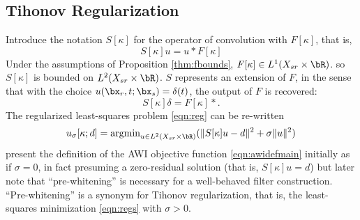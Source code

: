 

\subsection{Tihonov Regularization}
Introduce the notation $S[\kappa]$ for the operator of convolution
with $F[\kappa]$, that is,
\begin{equation}
  \label{eqn:sdef}
  S[\kappa]u = u*F[\kappa]
\end{equation}
Under the assumptions of Proposition \ref{thm:fbounds}, $F[\kappa] \in
L^1(X_{sr} \times \bR)$. so $S[\kappa]$ is bounded on $L^2(X_{sr} \times \bR)$.
$S$ represents an
extension of $F$, in the sense that with the choice
$u(\bx_r,t;\bx_s)=\delta(t)$, the output of $F$ is recovered:
\begin{equation}
  \label{eqn:sconsist}
  S[\kappa]\delta = F[\kappa]*.
\end{equation}
The regularized least-squares problem \ref{eqn:reg} can be re-written
\begin{equation}
  \label{eqn:regs}
    u_{\sigma}[\kappa;d] = \mbox{argmin}_{u \in L^2(X_{sr} \times \bR)} (\|S[\kappa]u-d\|^2 + \sigma\|u\|^2)
  \end{equation}
\cite{Warner:16} present the definition of the AWI objective function
\ref{eqn:awidefmain} initially as if $\sigma=0$, in fact presuming a
zero-residual solution (that is, $S[\kappa]u=d$) but later note that
``pre-whitening'' is necessary for a well-behaved filter construction.
``Pre-whitening'' is a synonym for Tihonov regularization, that is,
the least-squares minimization \ref{eqn:regs} with $\sigma>0$.

